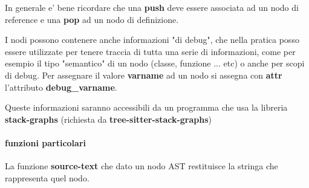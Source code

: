 In generale e' bene ricordare che una \textbf{push} deve essere associata ad un nodo di reference e una \textbf{pop} ad un nodo di definizione.

I nodi possono contenere anche informazioni "di debug", che nella pratica posso essere utilizzate per tenere traccia di tutta una serie di informazioni, come per esempio il tipo "semantico" di un nodo (classe, funzione ... etc) o anche per scopi di debug.
Per assegnare il valore \textbf{varname} ad un nodo si assegna con \textbf{attr} l'attributo \textbf{debug\_varname}.

Queste informazioni saranno accessibili da un programma che usa la libreria \textbf{stack-graphs} (richiesta da \textbf{tree-sitter-stack-graphs})

\paragraph{funzioni particolari}

La funzione \textbf{source-text} che dato un nodo AST restituisce la stringa che rappresenta quel nodo.
